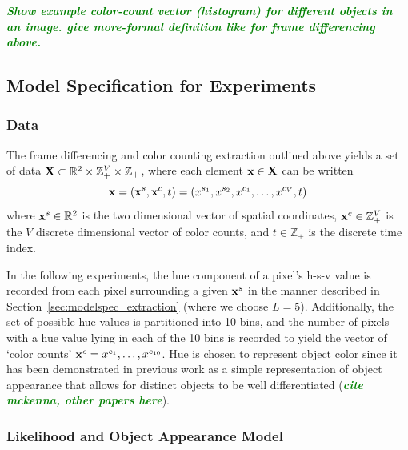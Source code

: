 \documentclass{article}
\newcommand{\willie}[1]{\textcolor{green}{\textsf{\emph{\textbf{\textcolor{green}{#1}}}}}}
\begin{document}
\willie{Show example color-count vector (histogram) for different objects in an image. give more-formal definition like for frame differencing above.}







\subsection{Model Specification for Experiments}
%

\subsubsection{Data}

The frame differencing and color counting extraction outlined above yields a set of data $\bold{X} \subset \mathbb{R}^{2} \times \mathbb{Z}_{+}^{V} \times \mathbb{Z}_{+}$, where each element $\bold{x} \in \bold{X}$ can be written
\begin{equation}
\bold{x} = ( \bold{x}^{s}, \bold{x}^{c}, t ) = ( x^{s_{1}}, x^{s_{2}}, x^{c_{1}}, \ldots, x^{c_{V}}, t )
\end{equation}
where $\bold{x}^{s} \in \mathbb{R}^{2}$ is the two dimensional vector of spatial coordinates,  $\bold{x}^{c} \in \mathbb{Z}_{+}^{V}$ is the $V$ discrete dimensional vector of color counts, and $t \in \mathbb{Z}_{+}$ is the discrete time index. 

In the following experiments, the hue component of a pixel's h-s-v value is recorded from each pixel surrounding a given $\bold{x}^{s}$ in the manner described in Section~\ref{sec:modelspec_extraction} (where we choose $L=5$). Additionally, the set of possible hue values is partitioned into 10 bins, and the number of pixels with a hue value lying in each of the 10 bins is recorded to yield the vector of `color counts' $\bold{x}^{c} = x^{c_{1}}, \ldots, x^{c_{10}}$. Hue is chosen to represent object color since it has been demonstrated in previous work as a simple representation of object appearance that allows for distinct objects to be well differentiated (\willie{cite mckenna, other papers here}).



\subsubsection{Likelihood and Object Appearance Model}
\end{document}
